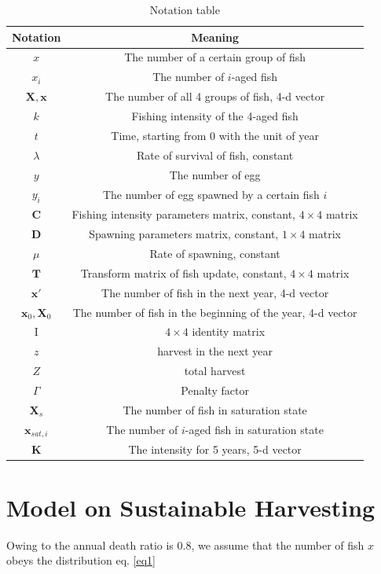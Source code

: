 \documentclass{IEEEtran}
\begin{document}
\begin{table}[h]
    \centering
    \caption{Notation table}
    \label{notations}
    \begin{tabular}{cc}
        \toprule
        Notation & Meaning \\ \midrule
        $x$ & The number of a certain group of fish \\
        $x_i$ & The number of $i$-aged fish \\
        $\bm X, \bm x$ & The number of all 4 groups of fish, 4-d vector\\
        $k$ & Fishing intensity of the 4-aged fish \\
        $t$ & Time, starting from 0 with the unit of year \\
        $\lambda$ & Rate of survival of fish, constant \\
        $y$ & The number of egg\\
        $y_i$ & The number of egg spawned by a certain fish $i$\\ 
        $\pmb C$ & Fishing intensity parameters matrix, constant, $4 \times 4$ matrix\\
        $\pmb D$ & Spawning parameters matrix, constant, $1 \times 4$ matrix\\
        $\mu$ & Rate of spawning, constant \\
        $\pmb T$ & Transform matrix of fish update, constant, $4 \times 4$ matrix\\
        $\bm x'$ & The number of fish in the next year, 4-d vector\\
        $\bm x_0, \bm X_0$ & The number of fish in the beginning of the year, 4-d vector\\
        $\mathrm I$ & $4 \times 4$ identity matrix\\
        $z$ & harvest in the next year\\
        $Z$ & total harvest\\
        $\Gamma$ & Penalty factor\\
        $\bm X_s$ & The number of fish in saturation state\\
        $\bm x_{sat,i}$ & The number of $i$-aged fish in saturation state\\
        $\bm K$ & The intensity for 5 years, 5-d vector\\
        \bottomrule
    \end{tabular}
\end{table}

\section{Model on Sustainable Harvesting} \label{model1}
Owing to the annual death ratio is 0.8, we assume that the number of fish $x$ obeys the distribution eq. \ref{eq1}
\end{document}

